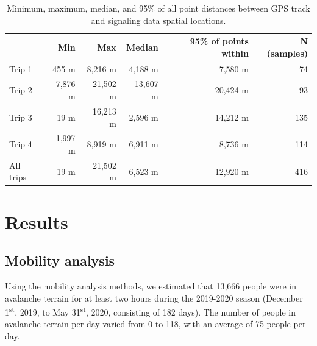 \documentclass[authordate,empirical, issue]{jote-new-article}
\begin{document}
\begin{table}[t]
  \begin{fullwidth}

    \centering
    \caption{Minimum, maximum, median, and 95\% of all point distances between GPS track and signaling data spatial locations.}
    \begin{tabular}{@{} l r r r r r @{}}
      \toprule
                                     & \textbf{Min} & \textbf{Max} &
      \textbf{Median}                &
      \textbf{95\% of points within} &
      \textbf{N (samples)}                                           \\
      \midrule

      Trip 1                         & 455 m        & 8,216 m      &
      4,188 m                        & 7,580 m      & 74             \\

      Trip 2                         & 7,876 m      & 21,502 m     &
      13,607 m                       & 20,424 m     & 93             \\

      Trip 3                         & 19 m         & 16,213 m     &
      2,596 m                        & 14,212 m     & 135            \\

      Trip 4                         & 1,997 m      & 8,919 m      &
      6,911 m                        & 8,736 m      & 114            \\

      All trips                      & 19 m         & 21,502 m     &
      6,523 m                        & 12,920 m     & 416            \\
      \bottomrule
    \end{tabular}
  \end{fullwidth}
\end{table}



\section{Results}



\subsection{Mobility analysis}



Using the mobility analysis methods, we estimated that 13,666 people were in avalanche terrain for at least two hours during the 2019-2020 season (December 1\textsuperscript{st}, 2019, to May 31\textsuperscript{st}, 2020, consisting of 182 days). The number of people in avalanche terrain per day varied from 0 to 118, with an average of 75 people per day.
\end{document}
